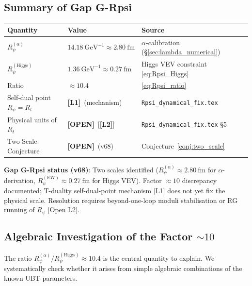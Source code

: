 \documentclass[12pt]{article}
\theoremstyle{definition}
\theoremstyle{remark}
\newcommand{\Lone}{\textbf{[L1]}}
\newcommand{\Ltwo}{\textbf{[L2]}}
\newcommand{\OPEN}{\textbf{[OPEN]}}
\begin{document}
\subsection{Summary of Gap G-Rpsi}

\begin{center}
\begin{tabular}{|l|l|l|}
\hline
\textbf{Quantity} & \textbf{Value} & \textbf{Source} \\
\hline
$R_\psi^{(\alpha)}$ & $14.18~\text{GeV}^{-1} \approx 2.80~\text{fm}$
  & $\alpha$-calibration (§\ref{sec:lambda_numerical}) \\
$R_\psi^{(\text{Higgs})}$ & $1.36~\text{GeV}^{-1} \approx 0.27~\text{fm}$
  & Higgs VEV constraint \eqref{eq:Rpsi_Higgs} \\
Ratio & $\approx 10.4$ & \eqref{eq:Rpsi_ratio} \\
Self-dual point $R_\psi = R_t$ & \Lone\ (mechanism) & \texttt{Rpsi\_dynamical\_fix.tex} \\
Physical units of $R_t$ & \OPEN\ [\Ltwo] & \texttt{Rpsi\_dynamical\_fix.tex} §5 \\
Two-Scale Conjecture & \OPEN\ (v68) & Conjecture~\ref{conj:two_scale} \\
\hline
\end{tabular}
\end{center}

\noindent\textbf{Gap G-Rpsi status (v68)}: Two scales identified
($R_\psi^{(\alpha)} \approx 2.80~\text{fm}$ for $\alpha$-derivation,
$R_\psi^{(\text{EW})} \approx 0.27~\text{fm}$ for Higgs VEV).
Factor $\approx 10$ discrepancy documented; T-duality self-dual-point
mechanism [L1] does not yet fix the physical scale.
Resolution requires beyond-one-loop moduli stabilisation or
RG running of $R_\psi$ [Open L2].

\subsection{Algebraic Investigation of the Factor $\sim 10$}
\label{subsec:factor10_investigation}


The ratio $R_\psi^{(\alpha)}/R_\psi^{(\text{Higgs})} \approx 10.4$
is the central quantity to explain.  We systematically check
whether it arises from simple algebraic combinations of the
known UBT parameters.
\end{document}
